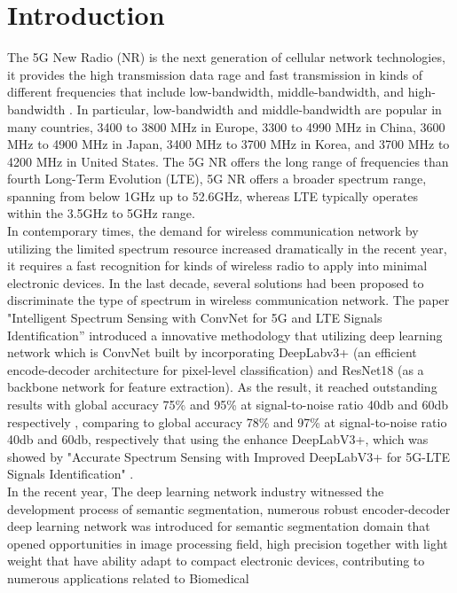 \documentclass[journal]{IEEEtran} %
\begin{document}
\section{Introduction}
The 5G New Radio (NR) is the next generation of cellular network technologies, it provides the high transmission data rage and fast transmission in kinds of different frequencies that include low-bandwidth, middle-bandwidth, and high-bandwidth \cite{b7}. In particular, low-bandwidth and middle-bandwidth are popular in many countries, 3400 to 3800 MHz in Europe, 3300 to 4990 MHz in China, 3600 MHz to 4900 MHz in Japan, 3400 MHz to 3700 MHz in Korea, and 3700 MHz to 4200 MHz in United States. The 5G NR offers the long range of frequencies than fourth Long-Term Evolution (LTE), 5G NR offers a broader spectrum range, spanning from below 1GHz up to 52.6GHz, whereas LTE typically operates within the 3.5GHz to 5GHz range.
\\
\indent
In contemporary times, the demand for wireless communication network by utilizing the limited spectrum resource increased dramatically in the recent year, it requires a fast recognition for kinds of wireless radio to apply into minimal electronic devices. In the last decade, several solutions had been proposed to discriminate the type of spectrum in wireless communication network. The paper "Intelligent Spectrum Sensing with ConvNet for 5G and LTE Signals Identification”\cite{b1} introduced a innovative methodology that utilizing deep learning network which is ConvNet built by incorporating DeepLabv3+ (an efficient encode-decoder architecture for pixel-level classification) and ResNet18 (as a backbone network for feature extraction). As the result, it reached outstanding results with global accuracy 75\% and 95\% at signal-to-noise ratio 40db and 60db respectively \cite{b1}, comparing to global accuracy 78\% and 97\% at signal-to-noise ratio 40db and 60db, respectively that using the enhance DeepLabV3+, which was showed by "Accurate Spectrum Sensing with Improved DeepLabV3+ for 5G-LTE Signals Identification" \cite{b2}.
\\
\indent
In the recent year, The deep learning network industry witnessed the development process of semantic segmentation, numerous robust encoder-decoder deep learning network was introduced for semantic segmentation domain that opened opportunities in image processing field, high precision together with light weight that have ability adapt to compact electronic devices, contributing to numerous applications related to Biomedical
\end{document}
